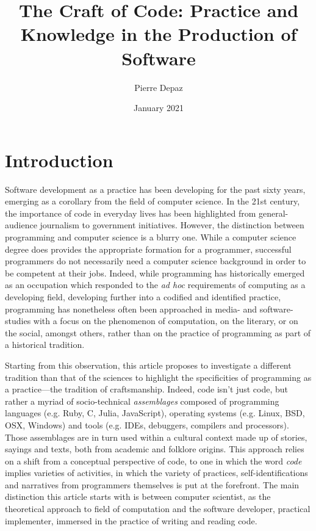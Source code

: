 \documentclass{article}
\begin{document}
\title{The Craft of Code: Practice and Knowledge in the Production of Software}
\author{Pierre Depaz}
\date{January 2021}
\maketitle

\section{Introduction}

Software development as a practice has been developing for the past sixty years, emerging as a corollary from the field of computer science. In the 21st century, the importance of code in everyday lives has been highlighted from general-audience journalism\cite{ford_what_2015} to government initiatives\cite{wilson_hour_2015}. However, the distinction between programming and computer science is a blurry one. While a computer science degree does provides the appropriate formation for a programmer, successful programmers do not necessarily need a computer science background in order to be competent at their jobs. Indeed, while programming has historically emerged as an occupation which responded to the \textit{ad hoc} requirements of computing as a developing field\cite{chun_software_2005}, developing further into a codified and identified practice\cite{dijkstra_chapter_1972}, programming has nonetheless often been approached in media- and software- studies with a focus on the phenomenon of computation\cite{berry_philosophy_2011}, on the literary\cite{hayles_my_2010}, or on the social\cite{mackenzie_cutting_2006}, amongst others, rather than on the practice of programming as part of a historical tradition.

Starting from this observation, this article proposes to investigate a different tradition than that of the sciences to highlight the specificities of programming as a practice—the tradition of craftsmanship. Indeed, code isn't just code, but rather a myriad of socio-technical \textit{assemblages} composed of programming languages (e.g. Ruby, C, Julia, JavaScript), operating systems (e.g. Linux, BSD, OSX, Windows) and tools (e.g. IDEs, debuggers, compilers and processors). Those assemblages are in turn used within a cultural context made up of stories, sayings and texts, both from academic and folklore origins. This approach relies on a shift from a conceptual perspective of code, to one in which the word \textit{code} implies varieties of activities\cite{hayes_cultures_2017}, in which the variety of practices, self-identifications and narratives from programmers themselves is put at the forefront. The main distinction this article starts with is between computer scientist, as the theoretical approach to field of computation and the software developer, practical implementer, immersed in the practice of writing and reading code.
\end{document}
